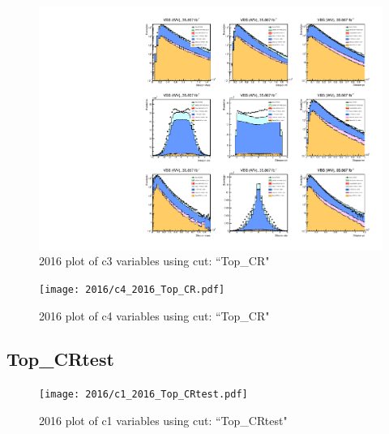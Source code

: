\documentclass{article}
\begin{document}
                        \begin{figure}[H]
                            \centering
                            \caption{2016 plot of c3 variables using cut: ``Top\_CR"}
                            \includegraphics[width=\textwidth]{2016/c3_2016_Top_CR.pdf}
                        \end{figure}    
                        \begin{figure}[H]
                            \centering
                            \caption{2016 plot of c4 variables using cut: ``Top\_CR"}
                            \texttt{[image: 2016/c4\_2016\_Top\_CR.pdf]}
                        \end{figure}    
      \subsection*{Top\_CRtest}
                        \begin{figure}[H]
                            \centering
                            \caption{2016 plot of c1 variables using cut: ``Top\_CRtest"}
                            \texttt{[image: 2016/c1\_2016\_Top\_CRtest.pdf]}
                        \end{figure}    
\end{document}
